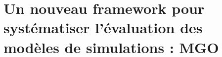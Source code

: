 \section{Un nouveau framework pour systématiser l'évaluation des modèles de simulations : MGO}
\label{sec:MGO}








